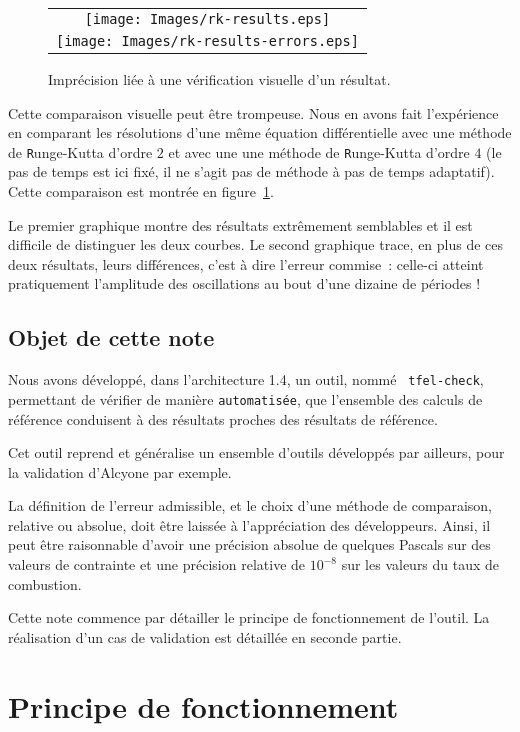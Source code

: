 \documentclass[a4paper,12pt]{article}
\newcommand{\nom}[1]{{\tt #1}}
\begin{document}
\begin{figure}[htbp]
  \centering
  \begin{tabular}[htbp]{c}
    \texttt{[image: Images/rk-results.eps]} \\
    \texttt{[image: Images/rk-results-errors.eps]}
  \end{tabular}
  \caption{Imprécision liée à une vérification visuelle d'un résultat.}
  \label{fig:imprecision}
\end{figure}

Cette comparaison visuelle peut être trompeuse. Nous en avons fait
l'expérience en comparant les résolutions d'une même équation
différentielle avec une méthode de {\nom Runge-Kutta} d'ordre $2$
et avec une une méthode de {\nom Runge-Kutta} d'ordre $4$ (le pas de
temps est ici fixé, il ne s'agit pas de méthode à pas de temps
adaptatif). Cette comparaison est montrée en
figure~\ref{fig:imprecision}.

Le premier graphique montre des résultats extrêmement
semblables et il est difficile de distinguer les deux courbes. Le
second graphique trace, en plus de ces deux résultats, leurs
différences, c'est à dire l'erreur commise~: celle-ci atteint
pratiquement l'amplitude des oscillations au bout d'une dizaine de
périodes !

\subsection{Objet de cette note}

Nous avons développé, dans l'architecture 1.4, un outil, nommé {\tt
tfel-check}, permettant de vérifier de manière {\tt automatisée},
que l'ensemble des calculs de référence conduisent à des résultats
proches des résultats de référence. 

Cet outil reprend et généralise un ensemble d'outils développés par
ailleurs, pour la validation d'Alcyone par exemple.

La définition de l'erreur admissible, et le choix d'une méthode de
comparaison, relative ou absolue, doit être laissée à l'appréciation
des développeurs. Ainsi, il peut être raisonnable d'avoir une
précision absolue de quelques Pascals sur des valeurs de contrainte
et une précision relative de $10^{-8}$ sur les valeurs
du taux de combustion.

Cette note commence par détailler le principe de fonctionnement de
l'outil. La réalisation d'un cas de validation est détaillée en seconde
partie.

\newpage
\section{Principe de fonctionnement}
\end{document}
